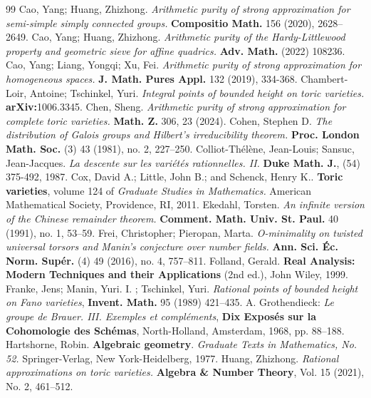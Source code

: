 \documentclass[11pt,letterpaper]{amsart}
\theoremstyle{plain}
\numberwithin{equation}{section}
\theoremstyle{definition}
\theoremstyle{remark}
\begin{document}
\begin{thebibliography}{99}
	 Cao, Yang; Huang, Zhizhong. \emph{Arithmetic purity of strong approximation for semi-simple simply connected groups.}	\textbf{Compositio Math.} 156 (2020), 2628--2649. 
	 Cao, Yang; Huang, Zhizhong. \emph{Arithmetic purity of the Hardy-Littlewood property and geometric sieve for affine quadrics.} \textbf{Adv. Math.} (2022) 108236.
	 Cao, Yang; Liang, Yongqi; Xu, Fei. \emph{Arithmetic purity of strong approximation for homogeneous spaces.} \textbf{J. Math. Pures Appl.} 132 (2019), 334-368.
	 Chambert-Loir, Antoine; Tschinkel, Yuri. \emph{Integral points of bounded height on toric varieties.} \textbf{arXiv:}1006.3345.
	 Chen, Sheng. {\em Arithmetic purity of strong approximation for complete toric varieties.} \textbf{Math. Z.} 306, 23 (2024).
	 Cohen, Stephen D. \emph{The distribution of Galois groups and Hilbert's irreducibility theorem.} \textbf{Proc. London Math. Soc.} (3) 43 (1981), no. 2, 227--250.
	  Colliot-Thél\`ene, Jean-Louis;  Sansuc, Jean-Jacques. \emph{La descente sur les variétés rationnelles. II.}  \textbf{Duke Math. J.}, (54) 375-492, 1987.
	  Cox, David A.; Little, John B.; and Schenck, Henry K.. \textbf{Toric varieties}, volume 124 of \emph{Graduate Studies in Mathematics.} American Mathematical Society, Providence, RI, 2011.
	 Ekedahl, Torsten. \emph{An infinite version of the Chinese remainder theorem.} \textbf{Comment. Math. Univ. St. Paul.} 40 (1991), no. 1, 53--59.
	 Frei, Christopher; Pieropan, Marta. \emph{O-minimality on twisted universal torsors and Manin's conjecture over number fields.} \textbf{Ann. Sci. Éc. Norm. Supér.} (4) 49 (2016), no. 4, 757--811. 
	 Folland, Gerald. \textbf{Real Analysis: Modern Techniques and their Applications} (2nd ed.), John Wiley, 1999.
	 Franke, Jens; Manin,  Yuri. I. ; Tschinkel, Yuri. \emph{Rational points of bounded height on Fano
	varieties}, \textbf{Invent. Math.} 95 (1989) 421--435.
 A. Grothendieck: \emph{Le groupe de Brauer. III. Exemples et compléments}, \textbf{Dix Exposés sur la Cohomologie des Schémas}, North-Holland, Amsterdam, 1968, pp. 88--188.
	  Hartshorne, Robin. \textbf{Algebraic geometry}. \emph{Graduate Texts in Mathematics, No. 52.} Springer-Verlag, New York-Heidelberg, 1977. 
	 Huang, Zhizhong. \emph{Rational approximations on toric varieties.} \textbf{Algebra \& Number Theory}, Vol. 15 (2021), No. 2, 461--512.

\end{thebibliography}
\end{document}
